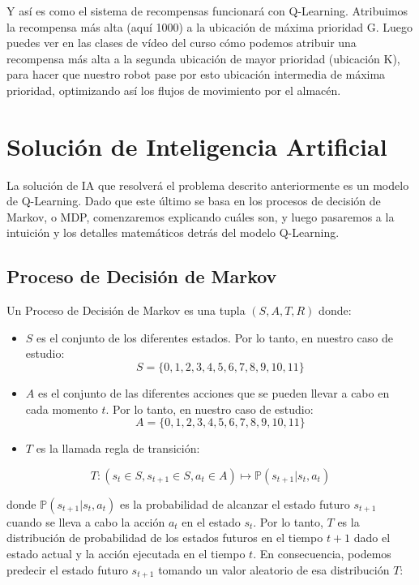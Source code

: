 \documentclass[
]{book}
\providecommand{\tightlist}{%
  \setlength{\itemsep}{0pt}\setlength{\parskip}{0pt}}
\begin{document}
Y así es como el sistema de recompensas funcionará con Q-Learning. Atribuimos la recompensa más alta (aquí 1000) a la ubicación de máxima prioridad G. Luego puedes ver en las clases de vídeo del curso cómo podemos atribuir una recompensa más alta a la segunda ubicación de mayor prioridad (ubicación K), para hacer que nuestro robot pase por esto ubicación intermedia de máxima prioridad, optimizando así los flujos de movimiento por el almacén.

\hypertarget{soluciuxf3n-de-inteligencia-artificial}{%
\section{Solución de Inteligencia Artificial}\label{soluciuxf3n-de-inteligencia-artificial}}

La solución de IA que resolverá el problema descrito anteriormente es un modelo de Q-Learning. Dado que este último se basa en los procesos de decisión de Markov, o MDP, comenzaremos explicando cuáles son, y luego pasaremos a la intuición y los detalles matemáticos detrás del modelo Q-Learning.

\hypertarget{proceso-de-decisiuxf3n-de-markov}{%
\subsection{Proceso de Decisión de Markov}\label{proceso-de-decisiuxf3n-de-markov}}

Un Proceso de Decisión de Markov es una tupla \((S, A, T, R)\) donde:

\begin{itemize}
\tightlist
\item
  \(S\) es el conjunto de los diferentes estados. Por lo tanto, en nuestro caso de estudio: \[S = \{0,1,2,3,4,5,6,7,8,9,10,11\}\]
\item
  \(A\) es el conjunto de las diferentes acciones que se pueden llevar a cabo en cada momento \(t\). Por lo tanto, en nuestro caso de estudio: \[A = \{0,1,2,3,4,5,6,7,8,9,10,11\}\]
\item
  \(T\) es la llamada regla de transición:
\end{itemize}

\[T : (s_t \in S, s_{t+1} \in S, a_t \in A) \mapsto \mathbb{P}(s_{t+1}|s_t,a_t)\]

donde \(\mathbb {P} (s_{t + 1} | s_t, a_t)\) es la probabilidad de alcanzar el estado futuro \(s_{t + 1}\) cuando se lleva a cabo la acción \(a_t\) en el estado \(s_t\). Por lo tanto, \(T\) es la distribución de probabilidad de los estados futuros en el tiempo \(t + 1\) dado el estado actual y la acción ejecutada en el tiempo \(t\). En consecuencia, podemos predecir el estado futuro \(s_{t + 1}\) tomando un valor aleatorio de esa distribución \(T\):
\end{document}

